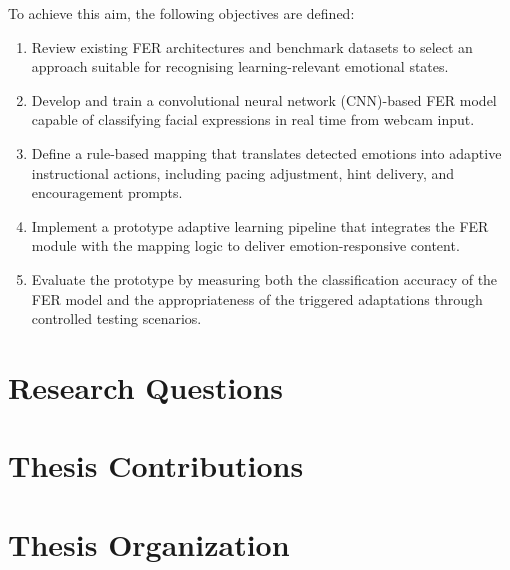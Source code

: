 To achieve this aim, the following objectives are defined:

\begin{enumerate}
    \item Review existing FER architectures and benchmark datasets to select an approach suitable for recognising learning-relevant emotional states.
    \item Develop and train a convolutional neural network (CNN)-based FER model capable of classifying facial expressions in real time from webcam input.
    \item Define a rule-based mapping that translates detected emotions into adaptive instructional actions, including pacing adjustment, hint delivery, and encouragement prompts.
    \item Implement a prototype adaptive learning pipeline that integrates the FER module with the mapping logic to deliver emotion-responsive content.
    \item Evaluate the prototype by measuring both the classification accuracy of the FER model and the appropriateness of the triggered adaptations through controlled testing scenarios.
\end{enumerate}


\section{Research Questions}

\section{Thesis Contributions }
\section{Thesis Organization}


\newpage